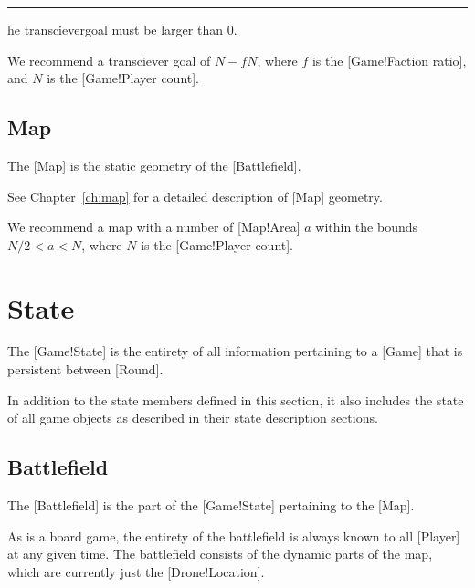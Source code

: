 \begin{rules}
    \rule{game.parameter.transcievergoal} The transcievergoal must be larger than \(0\).
\end{rules}

\begin{recommendations}
    \recommendation{} We recommend a transciever goal of \(N - fN\), where \(f\) is the [Game!Faction ratio], and \(N\) is the [Game!Player count].
\end{recommendations}

\subsection{Map}

The [Map] is the static geometry of the [Battlefield].

See Chapter~\ref{ch:map} for a detailed description of [Map] geometry.

\begin{recommendations}
    \recommendation{} We recommend a map with a number of [Map!Area] \(a\) within the bounds \(N/2< a < N\), where \(N\) is the [Game!Player count].
\end{recommendations}

\section{State}

The [Game!State] is the entirety of all information pertaining to a [Game] that is persistent between [Round].

In addition to the state members defined in this section, it also includes the state of all game objects as described in their state description sections.

\subsection{Battlefield}

The [Battlefield] is the part of the [Game!State] pertaining to the [Map].

As \DDD{} is a board game, the entirety of the battlefield is always known to all [Player] at any given time.
The battlefield consists of the dynamic parts of the map, which are currently just the [Drone!Location].

